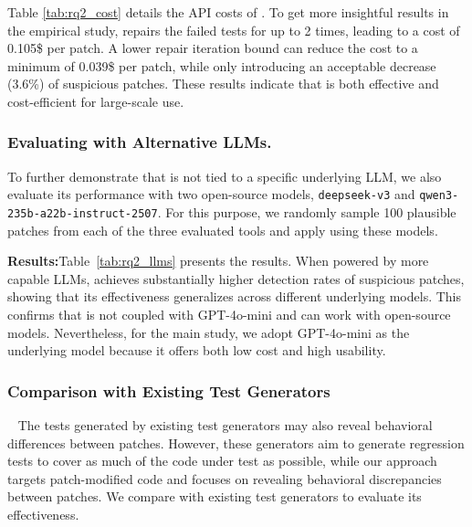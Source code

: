 

Table \ref{tab:rq2_cost} details the API costs of \appname. 
To get more insightful results in the empirical study, \appname repairs the failed tests for up to 2 times, leading to a cost of 0.105\$ per patch. 
A lower repair iteration bound can reduce the cost to a minimum of 0.039\$ per patch, while only introducing an acceptable decrease (3.6\%) of suspicious patches. 
These results indicate that \appname is both effective and cost-efficient for large-scale use.



\vspace{-5pt}

\subsubsection{Evaluating \appname with Alternative LLMs.}
To further demonstrate that \appname is not tied to a specific underlying LLM, 
we also evaluate its performance with two open-source models, \texttt{deepseek-v3} and \texttt{qwen3-235b-a22b-instruct-2507}. 
For this purpose, we randomly sample 100 plausible patches from each of the three evaluated tools and apply \appname using these models. 

\noindent \textbf{Results:}Table~\ref{tab:rq2_llms} presents the results. 
When powered by more capable LLMs, \appname achieves substantially higher detection rates of suspicious patches, 
showing that its effectiveness generalizes across different underlying models. 
This confirms that \appname is not coupled with GPT-4o-mini and can work with open-source models.
Nevertheless, for the main study, we adopt GPT-4o-mini as the underlying model because it offers both low cost and high usability.



\subsubsection{Comparison with Existing Test Generators}~\label{subsec:comparison}
The tests generated by existing test generators may also reveal behavioral differences between patches.
%
However, these generators aim to generate regression tests to cover as much of the code under test as possible, while our approach targets patch-modified code and focuses on revealing behavioral discrepancies between patches.
We compare \appname with existing test generators to evaluate its effectiveness.

